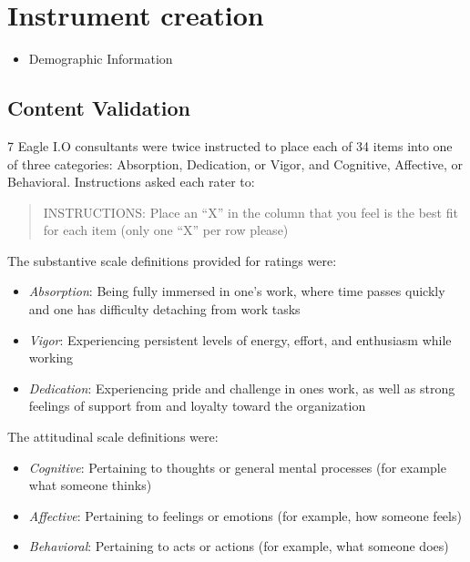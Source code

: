 \documentclass[
]{book}
\providecommand{\tightlist}{%
  \setlength{\itemsep}{0pt}\setlength{\parskip}{0pt}}
\begin{document}
\hypertarget{instrument-creation}{%
\chapter{Instrument creation}\label{instrument-creation}}

\begin{itemize}
\tightlist
\item
  Demographic Information
\end{itemize}

\hypertarget{content-validation}{%
\section{Content Validation}\label{content-validation}}

7 Eagle I.O consultants were twice instructed to place each of 34 items into one of three categories: Absorption, Dedication, or Vigor, and Cognitive, Affective, or Behavioral. Instructions asked each rater to:

\begin{quote}
INSTRUCTIONS: Place an ``X'' in the column that you feel is the best fit for each item (only one ``X'' per row please)
\end{quote}

The substantive scale definitions provided for ratings were:

\begin{itemize}
\tightlist
\item
  \emph{Absorption}: Being fully immersed in one's work, where time passes quickly and one has difficulty detaching from work tasks
\item
  \emph{Vigor}: Experiencing persistent levels of energy, effort, and enthusiasm while working
\item
  \emph{Dedication}: Experiencing pride and challenge in ones work, as well as strong feelings of support from and loyalty toward the organization
\end{itemize}

The attitudinal scale definitions were:

\begin{itemize}
\tightlist
\item
  \emph{Cognitive}: Pertaining to thoughts or general mental processes (for example what someone thinks)
\item
  \emph{Affective}: Pertaining to feelings or emotions (for example, how someone feels)
\item
  \emph{Behavioral}: Pertaining to acts or actions (for example, what someone does)
\end{itemize}
\end{document}
